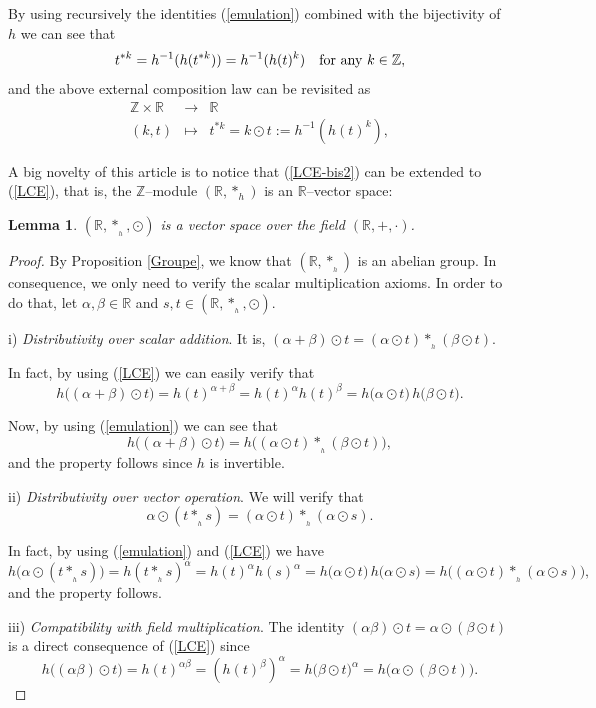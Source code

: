 \documentclass[10pt]{amsart}
\newtheorem{lemma}{Lemma}
\numberwithin{equation}{section}
\begin{document}
By using recursively the identities (\ref{emulation}) combined with the bijectivity of
$h$ we can see that
$$
t^{*k}=h^{-1}(h(t^{*k}))=h^{-1}(h(t)^{k}) \quad \textnormal{for any $k\in \mathbb{Z}$},
$$
and the above external composition law can be revisited as
\begin{equation}
\label{LCE-bis2}
\begin{array}{rcl}
\mathbb{Z} \times \mathbb{R} & \to &  \mathbb{R}  \\
(k,t) &\mapsto &  t^{*k}= k\odot t:=h^{-1}\left(h(t)^{k}\right),
\end{array} 
\end{equation}

A big novelty of this article is to notice that (\ref{LCE-bis2}) can be extended to (\ref{LCE}), that is,
the $\mathbb{Z}$--module $(\mathbb{R},*_{h})$ is an $\mathbb{R}$--vector space:
\begin{lemma}
\((\mathbb R,*_{_h}, \odot)\) is a vector space over the field \((\mathbb R,+,\cdot)\).
\end{lemma}

\begin{proof}
By Proposition \ref{Groupe}, we know that $(\mathbb{R},\ast_{_h})$ is an abelian group. 
In consequence, we only need to verify the scalar multiplication axioms. In order to do
that, let $\alpha,\beta\in\mathbb R$ and $s,t\in (\mathbb R, *_{_h},\odot)$.


\medskip

\noindent i) \textit{Distributivity over scalar addition}. 
It is,   $
(\alpha+\beta)\odot t=(\alpha\odot t)*_{_h}(\beta\odot t).$


In fact, by using (\ref{LCE}) we can easily verify that
  \[
  h\big((\alpha+\beta)\odot t\big)=h(t)^{\alpha+\beta}=h(t)^{\alpha}h(t)^{\beta}
  =h\big(\alpha\odot t\big)\,h\big(\beta\odot t\big).
  \]

Now, by using (\ref{emulation}) we can see that
   \[
  h\big((\alpha+\beta)\odot t\big)=h\big((\alpha\odot t)*_{_h}(\beta\odot t)\big),
  \]
and the property follows since $h$ is invertible.
  \medskip
  
\noindent ii) \textit{Distributivity over vector operation}. We will verify that
$$
\alpha\odot(t*_{_h}s)=(\alpha\odot t)*_{_h}(\alpha\odot s).
$$

In fact, by using (\ref{emulation}) and (\ref{LCE}) we have 
  \[
  h\big(\alpha\odot(t*_{_h}s)\big)=h(t*_{_h}s)^{\alpha}
  =h(t)^{\alpha}h(s)^{\alpha}=h\big(\alpha\odot t\big)\,h\big(\alpha\odot s\big)
  =h\big((\alpha\odot t)*_{_h}(\alpha\odot s)\big),
  \]
and the property follows.

 \medskip 
\noindent iii) \textit{Compatibility with field multiplication}. The identity $
 (\alpha\beta)\odot t=\alpha\odot(\beta\odot t)
$
is a direct consequence of (\ref{LCE}) since
  \[
  h\big((\alpha\beta)\odot t\big)=h(t)^{\alpha\beta}=(h(t)^{\beta})^{\alpha}
  =h\big(\beta\odot t\big)^{\alpha}
  =h\big(\alpha\odot(\beta\odot t)\big).
  \]
 \end{proof}
\end{document}
